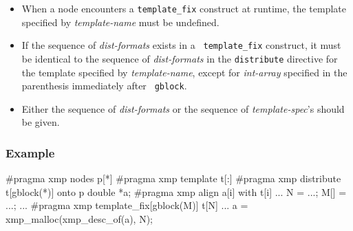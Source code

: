 \begin{itemize}
\item When a node encounters a {\tt template\_fix} construct at runtime,
      the template specified by {\it template-name} must be undefined.
\item If the sequence of {\it dist-formats} exists in a {\tt
      template\_fix} construct, it must be identical to the 
      sequence of {\it dist-formats} in the {\tt distribute} directive
      for the template specified by {\it template-name}, except for {\it
      int-array} specified in the parenthesis immediately after {\tt
      gblock}.
\item Either the sequence of {\it dist-formats} or the sequence of {\it
      template-spec}'s should be given.
\end{itemize}

\subsubsection*{Example}

\vspace{0.5cm}
\begin{minipage}{0.46\hsize}
\begin{center}
\end{center}
\end{minipage}
%
\begin{minipage}{0.54\hsize}
\begin{center}
\begin{XCexampleR}
#pragma xmp nodes p[*]
#pragma xmp template t[:]
#pragma xmp distribute t[gblock(*)] onto p
double *a;
#pragma xmp align a[i] with t[i]
...
N = ...;
M[] = {...};
...
#pragma xmp template_fix[gblock(M)] t[N]
...
a = xmp_malloc(xmp_desc_of(a), N);
\end{XCexampleR}
\end{center}
\end{minipage}

